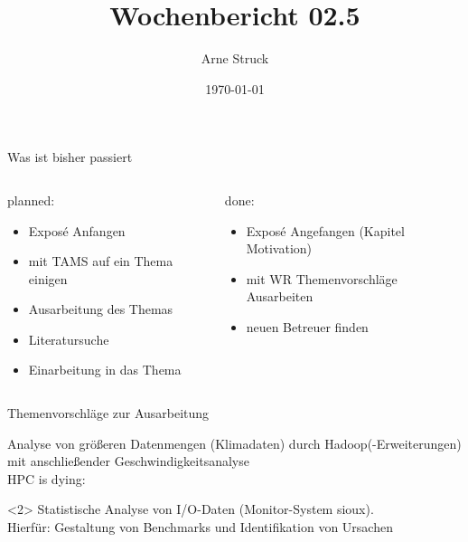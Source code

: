 \documentclass{beamer}
\title{Wochenbericht 02.5}
\subtitle{}
\author{Arne Struck}
\institute{Universität Hamburg, Fachschaft Informatik, Abschlussarbeitenseminar}
\date{\today}
\begin{document}
\begin{frame}
\maketitle
\end{frame}

\begin{frame}{Was ist bisher passiert}
\begin{columns}[t]
    \begin{column}{.5\textwidth}      	
      	\begin{block}{planned:}
        	\begin{itemize}
	        	\item Exposé Anfangen
        		\item mit TAMS auf ein Thema einigen
        		\item Ausarbeitung des Themas
        		\item Literatursuche
        		\item Einarbeitung in das Thema
        	\end{itemize}
    	\end{block}
    \end{column}
	\begin{column}{.5\textwidth}
		\uncover<2> {
		\begin{block}{done:}
        	\begin{itemize}
        		\item Exposé Angefangen (Kapitel Motivation)
	        	\item mit WR Themenvorschläge Ausarbeiten
    	    	\item neuen Betreuer finden
        	\end{itemize}
		\end{block}
		}
	\end{column}
\end{columns}
\end{frame}

\begin{frame}{Themenvorschläge zur Ausarbeitung}
\begin{block}{}
	Analyse von größeren Datenmengen (Klimadaten) durch Hadoop(-Erweiterungen) mit anschließender Geschwindigkeitsanalyse \\
	HPC is dying: \cite{hpcDies}
\end{block}
\begin{block}<2>{}
	Statistische Analyse von I/O-Daten (Monitor-System sioux). \\
	Hierfür: Gestaltung von Benchmarks und Identifikation von Ursachen
\end{block}
\end{frame}
\end{document}
